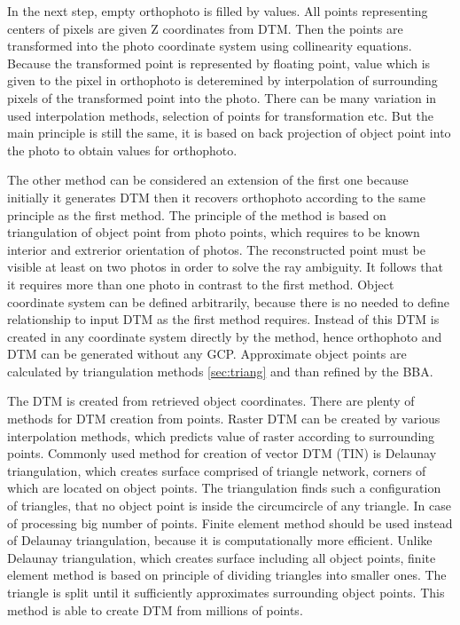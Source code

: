 \documentclass[a4paper,12pt]{article}
\begin{document}
In the next step, empty orthophoto is filled by values. 
All points representing centers of pixels are given Z coordinates from DTM. 
Then the points are transformed into the photo coordinate system using collinearity equations.
Because the transformed point is represented by floating point, value which is given 
to the pixel in orthophoto is deteremined by interpolation of surrounding pixels of the transformed 
point into the photo. There can be many variation in used interpolation methods, selection of points 
for transformation etc. 
But the main principle is still the same, it is based on back projection of object point into 
the photo to obtain values for orthophoto.


The other method can be considered an extension of the first one because initially it generates DTM then it recovers orthophoto 
according to the same principle as the first method. The principle of the method is based on triangulation of object point
from photo points, which requires to be known interior and extrerior orientation of photos. The reconstructed point 
must be visible at least on two photos in order to solve the ray ambiguity. It follows that it requires more than 
one photo in contrast to the first method.
Object coordinate system 
can be defined arbitrarily, because there is no needed to define relationship to input DTM as the first method requires.
Instead of this DTM is created in any coordinate system directly by the method,
hence orthophoto and DTM can be generated without any GCP. 
Approximate object points  are calculated by triangulation 
methods \ref{sec:triang} and than refined by the BBA. 

The DTM is created from retrieved object coordinates. There 
are plenty of methods for DTM creation from points. Raster DTM can be created by various interpolation methods, 
which predicts value of raster according to surrounding points. Commonly used method for  creation of 
vector DTM (TIN) is Delaunay triangulation, which creates surface comprised of triangle network, corners of which are located 
on object points. The triangulation finds such a configuration of triangles, that no object 
point is inside the circumcircle of any triangle.
In case of processing big number of points. Finite element method 
should be used instead of Delaunay triangulation, because it is computationally more efficient.
Unlike Delaunay triangulation, which creates surface including all object points, finite element method
is based on principle of dividing triangles into smaller ones. 
The triangle is split until it sufficiently approximates surrounding object points. 
This method is able to create DTM from millions of points.
\end{document}
